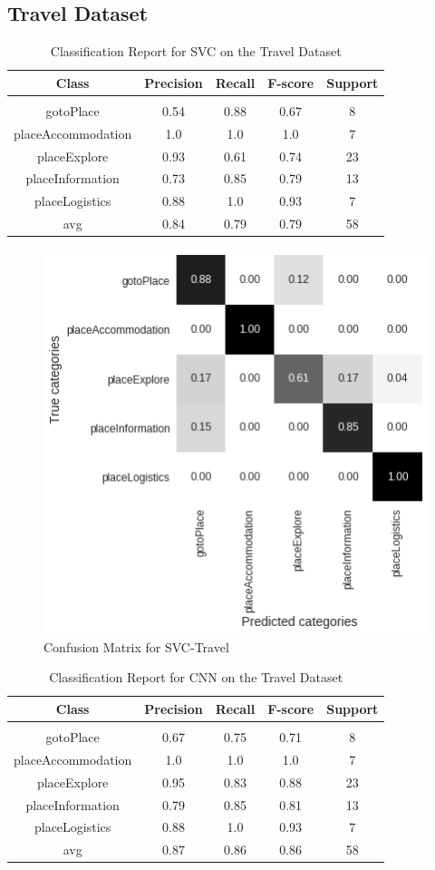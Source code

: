 \documentclass[11pt, oneside]{article}   	%
\begin{document}
\subsection{Travel Dataset}


\begin{table}[h]
\caption{Classification Report for SVC on the Travel Dataset}
\centering
\begin{tabular}{c | c c c c}
Class & Precision & Recall & F-score & Support\\
\hline
\hline\\
gotoPlace & 0.54 & 0.88 & 0.67 & 8\\
placeAccommodation & 1.0 & 1.0 & 1.0 & 7\\
placeExplore & 0.93 & 0.61 & 0.74 & 23\\
placeInformation & 0.73 & 0.85 & 0.79 & 13\\
placeLogistics & 0.88 & 1.0 & 0.93 & 7\\
avg & 0.84 & 0.79 & 0.79 & 58\\
\end{tabular}
\end{table}

\begin{figure}[h]
\centering
\includegraphics[width=0.6\linewidth]{SVC-Travel}
\caption{Confusion Matrix for SVC-Travel }
\label{fig:SVC-Travel}
\end{figure}

\newpage
\begin{table}[h]
\caption{Classification Report for CNN on the Travel Dataset}
\centering
\begin{tabular}{c | c c c c}
Class & Precision & Recall & F-score & Support\\
\hline
\hline\\
gotoPlace & 0.67 & 0.75 & 0.71 & 8\\
placeAccommodation & 1.0 & 1.0 & 1.0 & 7\\
placeExplore & 0.95 & 0.83 & 0.88 & 23\\
placeInformation & 0.79 & 0.85 & 0.81 & 13\\
placeLogistics & 0.88 & 1.0 & 0.93 & 7\\
avg & 0.87 & 0.86 & 0.86 & 58\\
\end{tabular}
\end{table}
\end{document}
